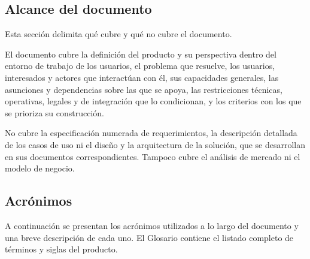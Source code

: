 \documentclass[11pt,a4paper]{article}
\begin{document}
\subsection{Alcance del documento}

Esta secci\'on delimita qu\'e cubre y qu\'e no cubre el documento.

El documento cubre la definici\'on del producto y su perspectiva dentro del
entorno de trabajo de los usuarios, el problema que resuelve, los usuarios,
interesados y actores que interact\'uan con \'el, sus capacidades generales, las
asunciones y dependencias sobre las que se apoya, las restricciones t\'ecnicas,
operativas, legales y de integraci\'on que lo condicionan, y los criterios con
los que se prioriza su construcci\'on.

No cubre la especificaci\'on numerada de requerimientos, la descripci\'on
detallada de los casos de uso ni el dise\~no y la arquitectura de la soluci\'on,
que se desarrollan en sus documentos correspondientes. Tampoco cubre el
an\'alisis de mercado ni el modelo de negocio.

\subsection{Acr\'onimos}

A continuaci\'on se presentan los acr\'onimos utilizados a lo largo del
documento y una breve descripci\'on de cada uno. El Glosario contiene el
listado completo de t\'erminos y siglas del producto.
\end{document}
